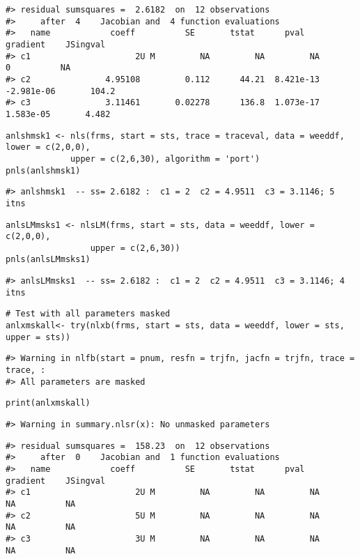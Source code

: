 \begin{verbatim}
#> residual sumsquares =  2.6182  on  12 observations
#>     after  4    Jacobian and  4 function evaluations
#>   name            coeff          SE       tstat      pval      gradient    JSingval   
#> c1                     2U M         NA         NA         NA           0          NA  
#> c2               4.95108         0.112      44.21  8.421e-13  -2.981e-06       104.2  
#> c3               3.11461       0.02278      136.8  1.073e-17   1.583e-05       4.482
\end{verbatim}

\begin{verbatim}
anlshmsk1 <- nls(frms, start = sts, trace = traceval, data = weeddf, lower = c(2,0,0),
             upper = c(2,6,30), algorithm = 'port')
pnls(anlshmsk1)
\end{verbatim}

\begin{verbatim}
#> anlshmsk1  -- ss= 2.6182 :  c1 = 2  c2 = 4.9511  c3 = 3.1146; 5  itns
\end{verbatim}

\begin{verbatim}
anlsLMmsks1 <- nlsLM(frms, start = sts, data = weeddf, lower = c(2,0,0),
                 upper = c(2,6,30))
pnls(anlsLMmsks1)
\end{verbatim}

\begin{verbatim}
#> anlsLMmsks1  -- ss= 2.6182 :  c1 = 2  c2 = 4.9511  c3 = 3.1146; 4  itns
\end{verbatim}

\begin{verbatim}
# Test with all parameters masked
anlxmskall<- try(nlxb(frms, start = sts, data = weeddf, lower = sts, upper = sts))
\end{verbatim}

\begin{verbatim}
#> Warning in nlfb(start = pnum, resfn = trjfn, jacfn = trjfn, trace = trace, :
#> All parameters are masked
\end{verbatim}

\begin{verbatim}
print(anlxmskall)
\end{verbatim}

\begin{verbatim}
#> Warning in summary.nlsr(x): No unmasked parameters
\end{verbatim}

\begin{verbatim}
#> residual sumsquares =  158.23  on  12 observations
#>     after  0    Jacobian and  1 function evaluations
#>   name            coeff          SE       tstat      pval      gradient    JSingval   
#> c1                     2U M         NA         NA         NA          NA          NA  
#> c2                     5U M         NA         NA         NA          NA          NA  
#> c3                     3U M         NA         NA         NA          NA          NA
\end{verbatim}

